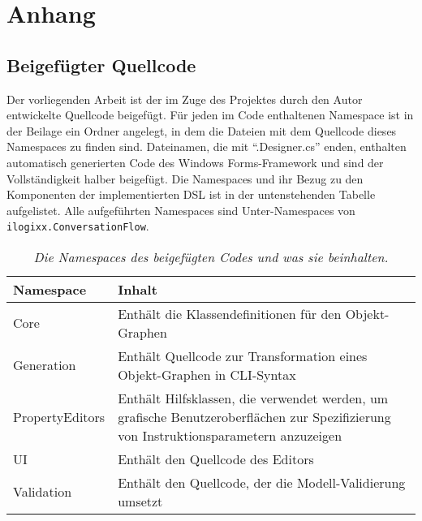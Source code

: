 \chapter{Anhang}

\section{Beigefügter Quellcode}
Der vorliegenden Arbeit ist der im Zuge des Projektes durch den Autor entwickelte Quellcode beigefügt. Für jeden im Code enthaltenen Namespace ist in der Beilage ein Ordner angelegt, in dem die Dateien mit dem Quellcode dieses Namespaces zu finden sind. Dateinamen, die mit ``.Designer.cs''  enden, enthalten automatisch generierten Code des Windows Forms-Framework und sind der Vollständigkeit halber beigefügt. Die Namespaces und ihr Bezug zu den Komponenten der implementierten DSL ist in der untenstehenden Tabelle aufgelistet. Alle aufgeführten Namespaces sind Unter-Namespaces von \texttt{ilogixx.ConversationFlow}.

\begin{table}[hbtp]
\centering
\settowidth{}
\begin{tabulary}{1.0\textwidth}{L|L}
\textbf{Namespace} & \textbf{Inhalt} \\
\hline

Core & Enthält die Klassendefinitionen für den Objekt-Graphen \\
\hline

Generation & Enthält Quellcode zur Transformation eines Objekt-Graphen in CLI-Syntax \\
\hline

PropertyEditors & Enthält Hilfsklassen, die verwendet werden, um grafische Benutzeroberflächen zur Spezifizierung von Instruktionsparametern anzuzeigen \\
\hline

UI & Enthält den Quellcode des Editors \\
\hline

Validation & Enthält den Quellcode, der die Modell-Validierung umsetzt \\
\hline

\end{tabulary}
\caption{\textit{Die Namespaces des beigefügten Codes und was sie beinhalten.}}
\label{tab:namespaces}
\end{table}